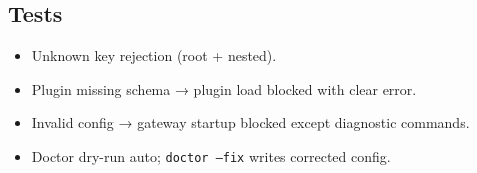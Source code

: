 \subsection{Tests}


\begin{itemize}
  \item Unknown key rejection (root + nested).
  \item Plugin missing schema → plugin load blocked with clear error.
  \item Invalid config → gateway startup blocked except diagnostic commands.
  \item Doctor dry-run auto; \texttt{doctor --fix} writes corrected config.
\end{itemize}



\clearpage
